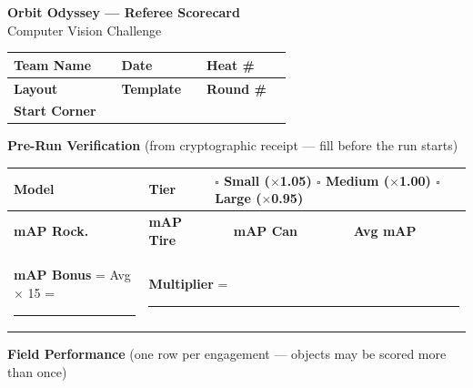 \documentclass[a4paper]{article}
\begin{document}
\begin{center}
{\Large \textbf{Orbit Odyssey --- Referee Scorecard}} \\[2pt]
{\small Computer Vision Challenge}
\end{center}

\vspace{0.4em}

{\small
\begin{tabular}{|p{2.2cm}|p{4.8cm}|p{2.2cm}|p{2.5cm}|p{1.5cm}|p{3cm}|}
\hline
\textbf{Team Name} & \rule{0pt}{14pt} & \textbf{Date} & & \textbf{Heat \#} & \\
\hline
\textbf{Layout} & & \textbf{Template} & & \textbf{Round \#} & \\
\hline
\textbf{Start Corner} & & & & & \\
\hline
\end{tabular}
}

\vspace{0.5em}

{\small \textbf{Pre-Run Verification} {\scriptsize (from cryptographic receipt --- fill before the run starts)}}

\vspace{0.2em}

{\small
\begin{tabular}{|p{2.2cm}|p{3.5cm}|p{1cm}|p{1.2cm}|p{1cm}|p{1.2cm}|p{1.5cm}|p{1.2cm}|}
\hline
\textbf{Model} & \rule{0pt}{14pt} & \textbf{Tier} & \multicolumn{5}{l|}{$\square$ Small ($\times$1.05) \quad $\square$ Medium ($\times$1.00) \quad $\square$ Large ($\times$0.95)} \\
\hline
\textbf{mAP Rock.} & & \textbf{mAP Tire} & & \textbf{mAP Can} & & \textbf{Avg mAP} & \\
\hline
\multicolumn{2}{|l|}{\textbf{mAP Bonus} = Avg $\times$ 15 = \rule{1.5cm}{0.4pt}} & \multicolumn{6}{l|}{\textbf{Multiplier} = \rule{1.5cm}{0.4pt}} \\
\hline
\end{tabular}
}

\vspace{0.5em}

{\small \textbf{Field Performance} {\scriptsize (one row per engagement --- objects may be scored more than once)}}

\vspace{0.2em}
\end{document}
